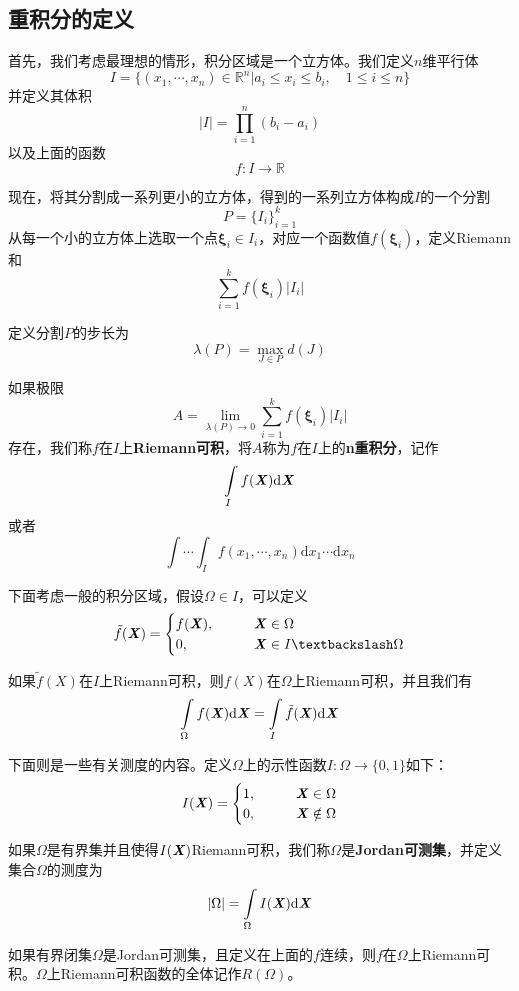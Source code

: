 \documentclass[UTF8,openany]{book}
\begin{document}
	\subsection{重积分的定义}
	首先，我们考虑最理想的情形，积分区域是一个立方体。我们定义$n$维平行体
	$$I=\{(x_1,\cdots,x_n)\in\mathbb{R}^n|a_i\leqslant x_i\leqslant b_i,\quad1\leqslant i\leqslant n\}$$
	并定义其体积
	$$|I|=\prod_{i=1}^{n}(b_i-a_i)$$
	以及上面的函数
	$$f:I\rightarrow \mathbb{R}$$
	\par 现在，将其分割成一系列更小的立方体，得到的一系列立方体构成$I$的一个分割
	$$P=\{I_i\}_{i=1}^{k}$$
	从每一个小的立方体上选取一个点$\boldsymbol{\xi}_i\in I_i$，对应一个函数值$f(\boldsymbol{\xi}_i)$，定义Riemann和
	$$\sum_{i=1}^{k}f(\boldsymbol{\xi}_i)|I_i|$$
	\par 定义分割$P$的步长为
	$$\lambda(P)=\max_{J\in P}d(J)$$
	\par 如果极限
	$$A=\lim_{\lambda(P)\rightarrow0}\sum_{i=1}^{k}f(\boldsymbol{\xi}_i)|I_i|$$
	存在，我们称$f$在$I$上\textbf{Riemann可积}，将$A$称为$f$在$I$上的\textbf{n重积分}，记作
	$$\int\limits_{I}f(\textbf{\textit{X}})\mathrm{d}\textbf{\textit{X}}$$
	或者
	$$\int\cdots\int_{I} f(x_1,\cdots,x_n)\mathrm{d}x_1\cdots\mathrm{d}x_n$$
	\par 下面考虑一般的积分区域，假设$\Omega\in I$，可以定义
	$$\tilde{f}(\textbf{\textit{X}})=
	\begin{cases}
	f(\textbf{\textit{X}}), & \qquad \textbf{\textit{X}}\in\Omega\\
	0, & \qquad \textbf{\textit{X}}\in I\textbackslash\Omega
	\end{cases}$$
	\par 如果$\tilde{f}(X)$在$I$上Riemann可积，则$f(X)$在$\Omega$上Riemann可积，并且我们有
	$$\int\limits_{\Omega}f(\textbf{\textit{X}})\mathrm{d}\textbf{\textit{X}}=
	\int\limits_{I}\tilde{f}(\textbf{\textit{X}})\mathrm{d}\textbf{\textit{X}}$$
	\par 下面则是一些有关测度的内容。定义$\Omega$上的示性函数$I:\Omega\rightarrow\{0,1\}$如下：
	$$I(\textbf{\textit{X}})=\begin{cases}
	1, & \qquad \textbf{\textit{X}}\in\Omega\\
	0, & \qquad \textbf{\textit{X}}\notin\Omega\\
	\end{cases}$$
	\par 如果$\Omega$是有界集并且使得$I(\textbf{\textit{X}})$Riemann可积，我们称$\Omega$是\textbf{Jordan可测集}，并定义集合$\Omega$的测度为
	$$|\Omega|=\int\limits_{\Omega}I(\textbf{\textit{X}})\mathrm{d}\textbf{\textit{X}}$$
	\par 如果有界闭集$\Omega$是Jordan可测集，且定义在上面的$f$连续，则$f$在$\Omega$上Riemann可积。$\Omega$上Riemann可积函数的全体记作$R(\Omega)$。
\end{document}
